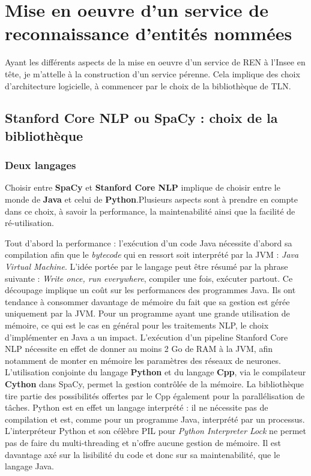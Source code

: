 \section{Mise en oeuvre d'un service de reconnaissance d'entités nommées}
Ayant les différents aspects de la mise en oeuvre d'un service de REN à l'Insee en tête, je m'attelle à la construction d'un service pérenne. Cela implique des choix d'architecture logicielle, à commencer par le choix de la bibliothèque de TLN.

\subsection{Stanford Core NLP ou SpaCy : choix de la bibliothèque}

\subsubsection{Deux langages}
Choisir entre \textbf{SpaCy} et \textbf{Stanford Core NLP} implique de choisir entre le monde de \textbf{Java} et celui de \textbf{Python}.Plusieurs aspects sont à prendre en compte dans ce choix, à savoir la performance, la maintenabilité ainsi que la facilité de ré-utilisation. 
\newline

Tout d'abord la performance : l'exécution d'un code Java nécessite d'abord sa compilation afin que le \textit{bytecode} qui en ressort soit interprété par la JVM : \textit{Java Virtual Machine}. L'idée portée par le langage peut être résumé par la phrase suivante : \textit{Write once, run everywhere}, compiler une fois, exécuter partout. Ce découpage implique un coût sur les performances des programmes Java. Ils ont tendance à consommer davantage de mémoire du fait que sa gestion est gérée uniquement par la JVM. Pour un programme ayant une grande utilisation de mémoire, ce qui est le cas en général pour les traitements NLP, le choix d'implémenter en Java a un impact. L'exécution d'un pipeline Stanford Core NLP nécessite en effet de donner au moins 2 Go de RAM à la JVM, afin notamment de monter en mémoire les paramètres des réseaux de neurones. L'utilisation conjointe du langage \textbf{Python} et du langage \textbf{Cpp}, via le compilateur \textbf{Cython} dans SpaCy, permet la gestion contrôlée de la mémoire. La bibliothèque tire partie des possibilités offertes par le Cpp également pour la parallélisation de tâches. Python est en effet un langage interprété : il ne nécessite pas de compilation et est, comme pour un programme Java, interprété par un processus. L'interpréteur Python et son célèbre PIL pour \textit{Python Interpreter Lock} ne permet pas de faire du multi-threading et n'offre aucune gestion de mémoire. Il est davantage axé sur la lisibilité du code et donc sur sa maintenabilité, que le langage Java.
\newline

